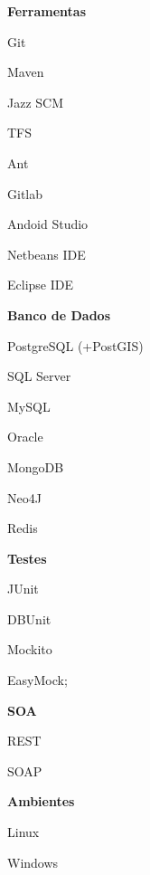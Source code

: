 \documentclass[paper=a4,fontsize=14pt]{article}
\let\olditemize\itemize
\let\endolditemize\enditemize
\renewenvironment{itemize}{%
    \small
    \olditemize
}{%
    \endolditemize
}
\begin{document}
\begin{multicols}{3}[]
\begin{itemize}[nolistsep]
    \item[] \hspace{-0.5cm} \textbf{Ferramentas}
    \item Git     
    \item Maven 
    \item Jazz SCM
    \item TFS
    \item Ant 
    \item Gitlab
    \item Andoid Studio 
    \item Netbeans IDE 
    \item Eclipse IDE
\end{itemize}

\columnbreak
\begin{itemize}[nolistsep]
    \item[] \hspace{-0.5cm} \textbf{Banco de Dados}
    \item PostgreSQL (+PostGIS) 
    \item SQL Server
    \item MySQL 
    \item Oracle
    \item MongoDB 
    \item Neo4J 
    \item Redis    
\end{itemize}

\columnbreak
\begin{itemize}[nolistsep]
    \item[] \hspace{-0.5cm} \textbf{Testes}
    \item JUnit 
    \item DBUnit 
    \item Mockito 
    \item EasyMock;    
\end{itemize}

\end{multicols}

\begin{multicols}{3}[]
\begin{itemize}[nolistsep]
    \item[] \hspace{-0.5cm} \textbf{SOA}
    \item REST
    \item SOAP
\end{itemize}

\columnbreak

\begin{itemize}[nolistsep]
    \item[] \hspace{-0.5cm} \textbf{Ambientes}
    \item Linux 
    \item Windows
\end{itemize}

\end{multicols}
\end{document}
